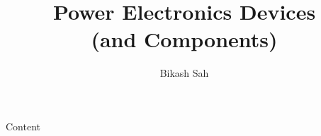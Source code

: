 \documentclass{../course_template/lectureClass}
\begin{document}

\title[Power Electronics Devices]{Power Electronics Devices \\ (and Components)}
\author{Bikash Sah}
\date{}
\begin{frame}[plain]
    \titlepage
\end{frame}

\begin{frame}{Content}
    \tableofcontents
\end{frame}


%

\end{document}
